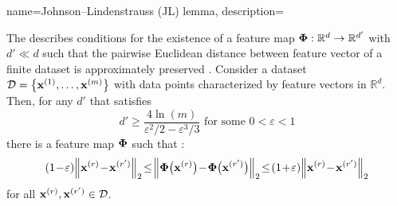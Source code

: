 {
{name={Johnson--Lindenstrauss (JL) lemma},
  description={The  describes conditions for 
  the existence of a feature map ${\bf \Phi}: \mathbb{R}^{d} \to \mathbb{R}^{d'}$ 
  with $d' \ll d$ such that the pairwise Euclidean distance 
  between feature vector of a finite dataset is approximately preserved 
  \cite{vershynin2018high,JMLR:v19:18-264,johnson1984extensions}. 
  Consider a dataset $\mathcal{D} = \big\{{\bf x}^{(1)}, \dots, {\bf x}^{(m)} \big\}$ 
  with data points characterized by feature vectors in $\mathbb{R}^{d}$. 
  Then, for any $d'$ that satisfies
	\[
	  d' \ge \frac{4 \ln(m)}{\varepsilon^2/2 - \varepsilon^3/3} \mbox{ for some } 0 < \varepsilon < 1
	\]  
   there is a feature map ${\bf \Phi}$ such that \cite{ProofJLlemma}: 
   \begin{equation} 
 		\label{equ_def_approx_norm_JL_lemma_dict}
 		(1\!-\!\varepsilon)\mleft\lVert {\bf x}^{(r)}\!-\!{\bf x}^{(r')} \mright\rVert_{2}  
 		\!\le\!\mleft\lVert {\bf \Phi}\big({\bf x}^{(r)}\big)\!-\!{\bf \Phi}\big({\bf x}^{(r')}\big) \mright\rVert_{2} 
		\!\le\!(1\!+\!\varepsilon)\mleft\lVert {\bf x}^{(r)}\!-\!{\bf x}^{(r')} \mright\rVert_{2}
 	\end{equation}
	for all ${\bf x}^{(r)}, {\bf x}^{(r')} \in \mathcal{D}$. 
	\begin{figure}[hbtp]
		\centering
\end{figure}}}}
